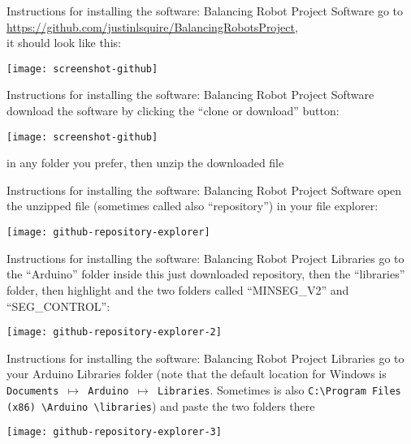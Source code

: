 \begin{frame}[t]{Instructions for installing the software: Balancing Robot Project Software}
	go to \url{https://github.com/justinlsquire/BalancingRobotsProject}, \\ it should look like this:
	\begin{center}
		\texttt{[image: screenshot-github]}
	\end{center}
\end{frame}


\begin{frame}[t]{Instructions for installing the software: Balancing Robot Project Software}
	download the software by clicking the ``clone or download'' button:
	\begin{center}
		\texttt{[image: screenshot-github]}
	\end{center}
	in any folder you prefer, then unzip the downloaded file
\end{frame}


\begin{frame}{Instructions for installing the software: Balancing Robot Project Software}
	open the unzipped file (sometimes called also ``repository'') in your file explorer:
	\begin{center}
		\texttt{[image: github-repository-explorer]}
	\end{center}
\end{frame}


\begin{frame}{Instructions for installing the software: Balancing Robot Project Libraries}
	go to the ``Arduino'' folder inside this just downloaded repository, then the ``libraries'' folder, then highlight and  the two folders called ``MINSEG\_V2'' and ``SEG\_CONTROL'':
	\begin{center}
		\texttt{[image: github-repository-explorer-2]}
	\end{center}
\end{frame}


\begin{frame}{Instructions for installing the software: Balancing Robot Project Libraries}
go to your Arduino Libraries folder (note that the default location for Windows is \texttt{Documents $\mapsto$ Arduino $\mapsto$ Libraries}. Sometimes is also \texttt{C:\textbackslash Program Files (x86) \textbackslash Arduino \textbackslash libraries}) and paste the two folders there
	\begin{center}
		\texttt{[image: github-repository-explorer-3]}
	\end{center}
\end{frame}


